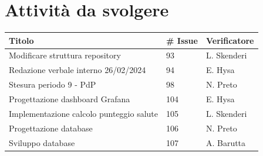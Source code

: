 \documentclass{article}
\begin{document}
\section{Attività da svolgere}
    \begin{center}
        \begin{tabular}{|C{7cm}|C{1,5cm}|C{3cm}|}
            \hline
            \textbf{Titolo} & \textbf{\# Issue} & \textbf{Verificatore} \\
            \hline\hline
            Modificare struttura repository & 93 & L. Skenderi \\
            Redazione verbale interno 26/02/2024 & 94 & E. Hysa \\
            Stesura periodo 9 - PdP & 98 & N. Preto \\
            Progettazione dashboard Grafana & 104 & E. Hysa \\
            Implementazione calcolo punteggio salute & 105 & L. Skenderi \\
            Progettazione database & 106 & N. Preto \\
            Sviluppo database & 107 & A. Barutta \\
            \hline
        \end{tabular}
    \end{center}
\end{document}

